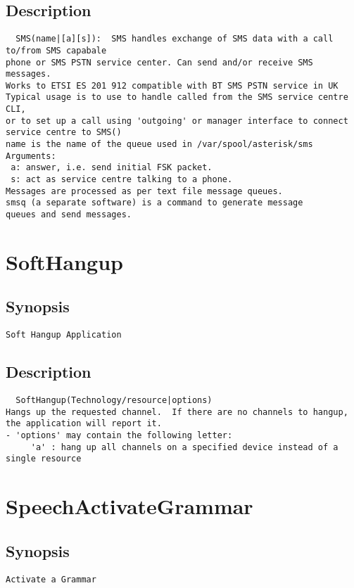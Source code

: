 \subsection{Description}
\begin{verbatim}
  SMS(name|[a][s]):  SMS handles exchange of SMS data with a call to/from SMS capabale
phone or SMS PSTN service center. Can send and/or receive SMS messages.
Works to ETSI ES 201 912 compatible with BT SMS PSTN service in UK
Typical usage is to use to handle called from the SMS service centre CLI,
or to set up a call using 'outgoing' or manager interface to connect
service centre to SMS()
name is the name of the queue used in /var/spool/asterisk/sms
Arguments:
 a: answer, i.e. send initial FSK packet.
 s: act as service centre talking to a phone.
Messages are processed as per text file message queues.
smsq (a separate software) is a command to generate message
queues and send messages.

\end{verbatim}


\section{SoftHangup}
\subsection{Synopsis}
\begin{verbatim}
Soft Hangup Application
\end{verbatim}
\subsection{Description}
\begin{verbatim}
  SoftHangup(Technology/resource|options)
Hangs up the requested channel.  If there are no channels to hangup,
the application will report it.
- 'options' may contain the following letter:
     'a' : hang up all channels on a specified device instead of a single resource

\end{verbatim}


\section{SpeechActivateGrammar}
\subsection{Synopsis}
\begin{verbatim}
Activate a Grammar
\end{verbatim}
